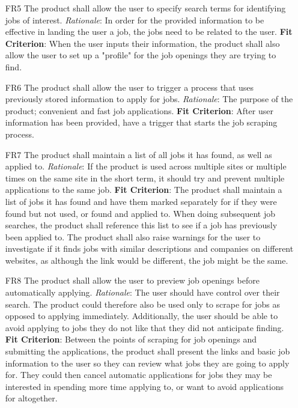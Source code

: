 \documentclass[12pt, titlepage]{article}
\begin{document}
\begin{itemize}
	\item [FR5] The product shall allow the user to specify search terms for identifying jobs of interest. 
	{\newline \emph{Rationale}: In order for the provided information to be effective in landing the user a job, the jobs need to be related to the user.
	\newline \textbf{Fit Criterion}: When the user inputs their information, the product shall also allow the user to set up a "profile" for the job openings they are trying to find.}
	
	\item [FR6] The product shall allow the user to trigger a process that uses previously stored information to apply for jobs. 
	{\newline \emph{Rationale}: The purpose of the product; convenient and fast job applications.
	\newline \textbf{Fit Criterion}: After user information has been provided, have a trigger that starts the job scraping process.}
	
	\item [FR7] The product shall maintain a list of all jobs it has found, as well as applied to. 
	{\newline \emph{Rationale}: If the product is used across multiple sites or multiple times on the same site in the short term, it should try and prevent multiple applications to the same job.
	\newline \textbf{Fit Criterion}: The product shall maintain a list of jobs it has found and have them marked separately for if they were found but not used, or found and applied to. When doing subsequent job searches, the product shall reference this list to see if a job has previously been applied to. The product shall also raise warnings for the user to investigate if it finds jobs with similar descriptions and companies on different websites, as although the link would be different, the job might be the same.}
	
	\item [FR8] The product shall allow the user to preview job openings before automatically applying. 
	{\newline \emph{Rationale}: The user should have control over their search. The product could therefore also be used only to scrape for jobs as opposed to applying immediately. Additionally, the user should be able to avoid applying to jobs they do not like that they did not anticipate finding.
	\newline \textbf{Fit Criterion}: Between the points of scraping for job openings and submitting the applications, the product shall present the links and basic job information to the user so they can review what jobs they are going to apply for. They could then cancel automatic applications for jobs they may be interested in spending more time applying to, or want to avoid applications for altogether.}
\end{itemize}
\end{document}

